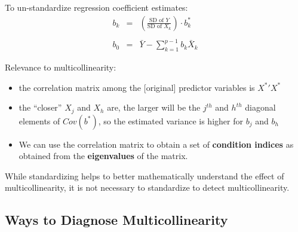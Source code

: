 \documentclass[12pt]{../notes}
\begin{document}
\begin{minipage}[l][2cm][c]{\textwidth}
\end{minipage}

To un-standardize regression coefficient estimates:
\begin{eqnarray}
   b_k & = & \left( \frac{\mbox{SD of $Y$}}{\mbox{SD of $X_k$}} \right) \cdot b^*_k \nonumber \\
    & \nonumber \\
   b_0 & = & \bar{Y} - \sum_{k=1}^{p-1} b_k \bar{X}_k \nonumber
\end{eqnarray}

\nspace
Relevance to multicollinearity:
\begin{itemize}
  \item  the correlation matrix among the [original] predictor variables is ${X^*}'X^*$
  \item  the ``closer'' $X_j$ and $X_h$ are, the larger will be the
$j^{th}$ and $h^{th}$ diagonal elements of $Cov(b^*)$, so the estimated variance
is higher for $b_j$ and $b_h$
\item We can use the correlation matrix to obtain a set of \textbf{condition indices} as obtained from the \textbf{eigenvalues} of the matrix. 
\end{itemize}

\nspace
While standardizing helps to better mathematically understand the effect of multicollinearity, it is not necessary to standardize to detect multicollinearity. 
\nspace

\subsection{Ways to Diagnose Multicollinearity}
\end{document}
